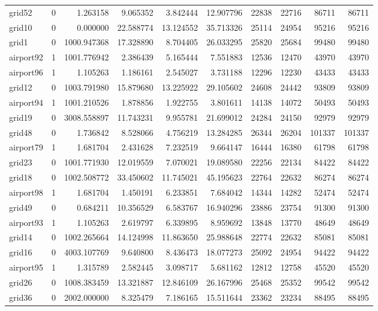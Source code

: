 \begin{longtable}{|l|r|r|r|r|r|r|r|r|r|}
grid52 & 0 & 1.263158 & 9.065352 & 3.842444 & 12.907796 & 22838 & 22716 & 86711 & 86711 \\
grid10 & 0 & 0.000000 & 22.588774 & 13.124552 & 35.713326 & 25114 & 24954 & 95216 & 95216 \\
grid1 & 0 & 1000.947368 & 17.328890 & 8.704405 & 26.033295 & 25820 & 25684 & 99480 & 99480 \\
airport92 & 1 & 1001.776942 & 2.386439 & 5.165444 & 7.551883 & 12536 & 12470 & 43970 & 43970 \\
airport96 & 1 & 1.105263 & 1.186161 & 2.545027 & 3.731188 & 12296 & 12230 & 43433 & 43433 \\
grid12 & 0 & 1003.791980 & 15.879680 & 13.225922 & 29.105602 & 24608 & 24442 & 93809 & 93809 \\
airport94 & 1 & 1001.210526 & 1.878856 & 1.922755 & 3.801611 & 14138 & 14072 & 50493 & 50493 \\
grid19 & 0 & 3008.558897 & 11.743231 & 9.955781 & 21.699012 & 24284 & 24150 & 92979 & 92979 \\
grid48 & 0 & 1.736842 & 8.528066 & 4.756219 & 13.284285 & 26344 & 26204 & 101337 & 101337 \\
airport79 & 1 & 1.681704 & 2.431628 & 7.232519 & 9.664147 & 16444 & 16380 & 61798 & 61798 \\
grid23 & 0 & 1001.771930 & 12.019559 & 7.070021 & 19.089580 & 22256 & 22134 & 84422 & 84422 \\
grid18 & 0 & 1002.508772 & 33.450602 & 11.745021 & 45.195623 & 22764 & 22632 & 86274 & 86274 \\
airport98 & 1 & 1.681704 & 1.450191 & 6.233851 & 7.684042 & 14344 & 14282 & 52474 & 52474 \\
grid49 & 0 & 0.684211 & 10.356529 & 6.583767 & 16.940296 & 23886 & 23754 & 91300 & 91300 \\
airport93 & 1 & 1.105263 & 2.619797 & 6.339895 & 8.959692 & 13848 & 13770 & 48649 & 48649 \\
grid14 & 0 & 1002.265664 & 14.124998 & 11.863650 & 25.988648 & 22774 & 22632 & 85081 & 85081 \\
grid16 & 0 & 4003.107769 & 9.640800 & 8.436473 & 18.077273 & 25092 & 24954 & 94422 & 94422 \\
airport95 & 1 & 1.315789 & 2.582445 & 3.098717 & 5.681162 & 12812 & 12758 & 45520 & 45520 \\
grid26 & 0 & 1008.383459 & 13.321887 & 12.846109 & 26.167996 & 25468 & 25352 & 99542 & 99542 \\
grid36 & 0 & 2002.000000 & 8.325479 & 7.186165 & 15.511644 & 23362 & 23234 & 88495 & 88495 \\

\end{longtable}
